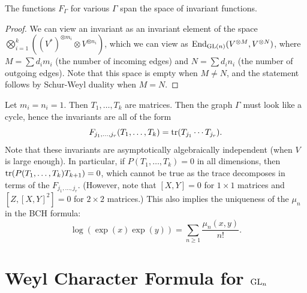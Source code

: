 \begin{theorem}
  The functions $F_\Gamma$
  for various $\Gamma$ span the
  space of invariant functions.
\end{theorem}

\begin{proof}
  We can view an invariant as an
  invariant element of the space
  $\bigotimes_{i = 1}^k ((V^*)^{\otimes m_i} \otimes  V^{\otimes n_i})$,
  which we can view as
  $\operatorname{End}_{\operatorname{GL}(n)}(V^{\otimes M}, V^{\otimes N})$,
  where $M = \sum d_i m_i$ (the number
  of incoming edges) and
  $N = \sum d_i n_i$ (the number of
  outgoing edges).
  Note that this space is empty
  when $M \ne N$, and the
  statement follows by Schur-Weyl
  duality when $M = N$.
\end{proof}

\begin{example}
  Let $m_i = n_i = 1$. Then
  $T_1, \dots, T_k$ are matrices.
  Then the graph $\Gamma$ must look
  like a cycle, hence the invariants
  are all of the form
  \[
    F_{j_1, \dots, j_r}
    (T_1, \dots, T_k)
    = \operatorname{tr}(T_{j_1} \cdots T_{j_r}).
  \]
  Note that these invariants
  are asymptotically algebraically
  independent (when $V$ is large enough).
  In particular,
  if $P(T_1, \dots, T_k) = 0$ in
  all dimensions, then
  $\operatorname{tr}(P(T_1, \dots, T_k) T_{k + 1}) = 0$,
  which cannot be true as the trace
  decomposes in terms of
  the $F_{j_1, \dots, j_r}$.
  (However, note that
  $[X, Y] = 0$ for $1 \times 1$
  matrices and
  $[Z, [X, Y]^2] = 0$ for
  $2 \times 2$ matrices.)
  This also implies the uniqueness
  of the $\mu_n$ in the BCH formula:
  \[
    \log (\exp(x) \exp(y))
    = \sum_{n \ge 1} \frac{\mu_n(x, y)}{n!}.
  \]
\end{example}

\section{Weyl Character Formula for \texorpdfstring{$\operatorname{GL}_n$}{GLn}}

